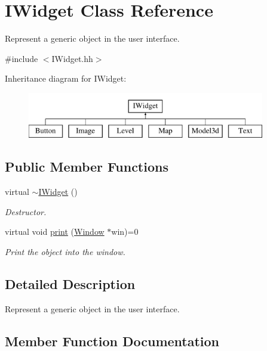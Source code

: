 \hypertarget{classIWidget}{}\section{I\+Widget Class Reference}
\label{classIWidget}


Represent a generic object in the user interface.  




{\ttfamily \#include $<$I\+Widget.\+hh$>$}

Inheritance diagram for I\+Widget\+:\begin{figure}[H]
\begin{center}
\leavevmode
\includegraphics[height=2.000000cm]{classIWidget}
\end{center}
\end{figure}
\subsection*{Public Member Functions}
\begin{DoxyCompactItemize}
\item 
\mbox{\label{classIWidget_ad733ed972c58c5c6268b57e2f4381666}} 
virtual \hyperlink{classIWidget_ad733ed972c58c5c6268b57e2f4381666}{$\sim$\+I\+Widget} ()
\begin{DoxyCompactList}\small\item\em Destructor. \end{DoxyCompactList}\item 
virtual void \hyperlink{classIWidget_a0cfa49a402e9bb31808a715e048ab2f4}{print} (\hyperlink{classWindow}{Window} $\ast$win)=0
\begin{DoxyCompactList}\small\item\em Print the object into the window. \end{DoxyCompactList}\end{DoxyCompactItemize}


\subsection{Detailed Description}
Represent a generic object in the user interface. 

\subsection{Member Function Documentation}
\mbox{\label{classIWidget_a0cfa49a402e9bb31808a715e048ab2f4}} 
